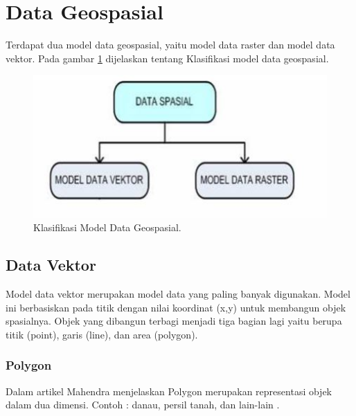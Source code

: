 \section{Data Geospasial}
Terdapat dua model data geospasial, yaitu model data raster dan model data vektor. 
Pada gambar \ref{datageospasial} dijelaskan tentang Klasifikasi model data geospasial.
\begin{figure}[ht]
	\centerline{\includegraphics[width=1\textwidth]{figures/datageospasial.JPG}}
	\caption{Klasifikasi Model Data Geospasial.}
	\label{datageospasial}
	\end{figure}

\subsection{Data Vektor}
Model data vektor merupakan model data yang paling banyak digunakan.
Model ini berbasiskan pada titik dengan nilai koordinat (x,y) untuk membangun objek spasialnya. Objek yang dibangun terbagi menjadi tiga bagian lagi yaitu berupa titik (point), garis (line), dan area (polygon).

\subsubsection{Polygon}
Dalam artikel Mahendra menjelaskan Polygon merupakan representasi objek dalam dua dimensi. Contoh : danau,
persil tanah, dan lain-lain \cite{mahendra2014sistem}.
